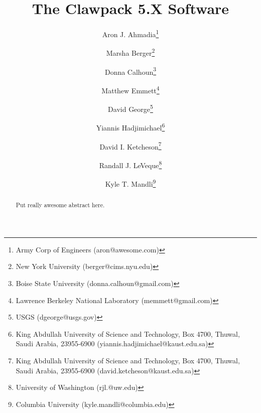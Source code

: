 \documentclass[]{article}
\begin{document}
\ifpdf
{}
\else
{}
\fi

\title{The Clawpack 5.X Software}


\author{
        Aron J. Ahmadia\thanks{
            Army Corp of Engineers (\mbox{aron@awesome.com})} \and
        Marsha Berger\thanks{
            New York University (\mbox{berger@cims.nyu.edu})} \and
        Donna Calhoun\thanks{
            Boise State University (\mbox{donna.calhoun@gmail.com})} \and
        Matthew Emmett\thanks{
            Lawrence Berkeley National Laboratory (\mbox{memmett@gmail.com})} \and
        David George\thanks{
            USGS (\mbox{dgeorge@usgs.gov})} \and
        Yiannis Hadjimichael\thanks{
            King Abdullah University of Science and Technology, Box 4700, Thuwal, Saudi Arabia, 23955-6900 (\mbox{yiannis.hadjimichael@kaust.edu.sa})} \and
        David I. Ketcheson\thanks{
            King Abdullah University of Science and Technology, Box 4700, Thuwal, Saudi Arabia, 23955-6900 (\mbox{david.ketcheson@kaust.edu.sa})} \and
        Randall J. LeVeque\thanks{
            University of Washington (\mbox{rjl.@uw.edu})} \and
        Kyle T. Mandli\thanks{
            Columbia University (\mbox{kyle.mandli@columbia.edu})}
        }

\maketitle

\begin{abstract}
    Put really awesome abstract here.
\end{abstract}











\end{document}
